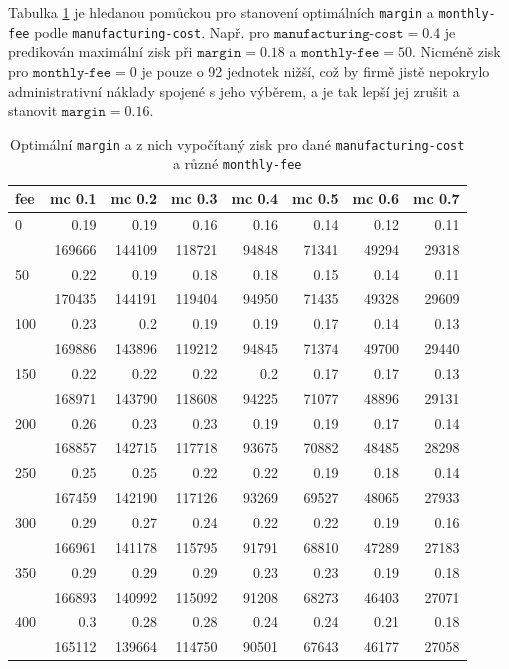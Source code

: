 \documentclass[a4wide,12pt]{report}
\begin{document}
Tabulka \ref{tab:max-profit2} je hledanou pomůckou pro stanovení optimálních \texttt{margin} a \texttt{monthly-fee} podle \texttt{manufacturing-cost}. Např. pro $\texttt{manufacturing-cost}=0.4$ je predikován maximální zisk při $\texttt{margin}=0.18$ a $\texttt{monthly-fee}=50$. Nicméně zisk pro $\texttt{monthly-fee}=0$ je pouze o 92 jednotek nižší, což by firmě jistě nepokrylo administrativní náklady spojené s jeho výběrem, a je tak lepší jej zrušit a stanovit $\texttt{margin}=0.16$.
\begin{table}[h]
\begin{center}
\begin{tabular}{|l|r|r|r|r|r|r|r|}
\hline
fee & \multicolumn{1}{l|}{mc 0.1} & \multicolumn{1}{l|}{mc 0.2} & \multicolumn{1}{l|}{mc 0.3} & \multicolumn{1}{l|}{mc 0.4} & \multicolumn{1}{l|}{mc 0.5} & \multicolumn{1}{l|}{mc 0.6} & \multicolumn{1}{l|}{mc 0.7} \\ \hline
0 & 0.19 & 0.19 & 0.16 & 0.16 & 0.14 & 0.12 & 0.11 \\ 
 & 169666 & 144109 & 118721 & 94848 & 71341 & 49294 & 29318 \\ \hline
50 & 0.22 & 0.19 & 0.18 & 0.18 & 0.15 & 0.14 & 0.11 \\ 
 & 170435 & 144191 & 119404 & 94950 & 71435 & 49328 & 29609 \\ \hline
100 & 0.23 & 0.2 & 0.19 & 0.19 & 0.17 & 0.14 & 0.13 \\ 
 & 169886 & 143896 & 119212 & 94845 & 71374 & 49700 & 29440 \\ \hline
150 & 0.22 & 0.22 & 0.22 & 0.2 & 0.17 & 0.17 & 0.13 \\ 
 & 168971 & 143790 & 118608 & 94225 & 71077 & 48896 & 29131 \\ \hline
200 & 0.26 & 0.23 & 0.23 & 0.19 & 0.19 & 0.17 & 0.14 \\ 
 & 168857 & 142715 & 117718 & 93675 & 70882 & 48485 & 28298 \\ \hline
250 & 0.25 & 0.25 & 0.22 & 0.22 & 0.19 & 0.18 & 0.14 \\ 
 & 167459 & 142190 & 117126 & 93269 & 69527 & 48065 & 27933 \\ \hline
300 & 0.29 & 0.27 & 0.24 & 0.22 & 0.22 & 0.19 & 0.16 \\ 
 & 166961 & 141178 & 115795 & 91791 & 68810 & 47289 & 27183 \\ \hline
350 & 0.29 & 0.29 & 0.29 & 0.23 & 0.23 & 0.19 & 0.18 \\ 
 & 166893 & 140992 & 115092 & 91208 & 68273 & 46403 & 27071 \\ \hline
400 & 0.3 & 0.28 & 0.28 & 0.24 & 0.24 & 0.21 & 0.18 \\ 
 & 165112 & 139664 & 114750 & 90501 & 67643 & 46177 & 27058 \\ \hline
\end{tabular}
\end{center}
\caption{Optimální \texttt{margin} a z nich vypočítaný zisk pro dané \texttt{manufacturing-cost} a různé \texttt{monthly-fee}}
\label{tab:max-profit2}
\end{table}
\end{document}
